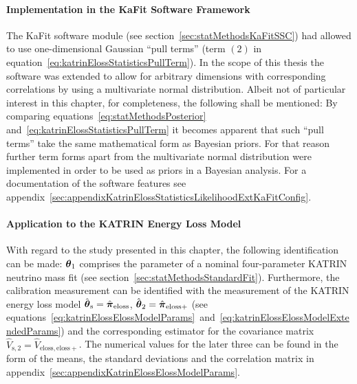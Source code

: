 \paragraph{Implementation in the KaFit Software Framework}
The KaFit software module (see section~\ref{sec:statMethodsKaFitSSC}) had allowed to use one-dimensional Gaussian ``pull terms'' (term $(2)$ in equation~\ref{eq:katrinElossStatisticsPullTerm}). In the scope of this thesis the software was extended to allow for arbitrary dimensions with corresponding correlations by using a multivariate normal distribution. Albeit not of particular interest in this chapter, for completeness, the following shall be mentioned: By comparing equations~\eqref{eq:statMethodsPosterior} and~\eqref{eq:katrinElossStatisticsPullTerm} it becomes apparent that such ``pull terms'' take the same mathematical form as Bayesian priors. For that reason further term forms apart from the multivariate normal distribution were implemented in order to be used as priors in a Bayesian analysis. For a documentation of the software features see appendix~\ref{sec:appendixKatrinElossStatisticsLikelihoodExtKaFitConfig}.

\paragraph{Application to the KATRIN Energy Loss Model}
With regard to the study presented in this chapter, the following identification can be made: $\boldsymbol{\mathbf{\theta}}_1$ comprises the parameter of a nominal four-parameter KATRIN neutrino mass fit (see section~\ref{sec:statMethodsStandardFit}). Furthermore, the calibration measurement can be identified with the measurement of the KATRIN energy loss model $\hat{\boldsymbol{\mathbf{\theta}}}_\mathrm{s}=\hat{\boldsymbol{\mathbf{\pi}}}_\mathrm{eloss}$, $\hat{\boldsymbol{\mathbf{\theta}}}_2=\hat{\boldsymbol{\mathbf{\pi}}}_\mathrm{eloss+}$ (see equations~\ref{eq:katrinElossElossModelParams}~and~\ref{eq:katrinElossElossModelExtendedParams}) and the corresponding estimator for the covariance matrix $\hat{V}_\mathrm{s,2}=\hat{V}_\mathrm{eloss,eloss+}$. The numerical values for the later three can be found in the form of the means, the standard deviations and the correlation matrix in appendix~\ref{sec:appendixKatrinElossElossModelParams}.



